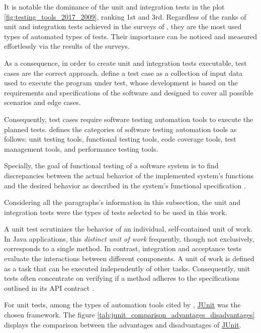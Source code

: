 It is notable the dominance of the unit and integration tests in the plot \ref{fig:testing_tools_2017_2009}, ranking 1st and 3rd. Regardless of the ranks of unit and integration tests achieved in the surveys of \cite{hynninen2023development, kasurinen2010software, lee2012survey, sanchez2020beyond}, they are the most used types of automated types of tests. Their importance can be noticed and measured effortlessly via the results of the surveys.

As a consequence, in order to create unit and integration tests executable, test cases are the correct approach. \cite{abo2023role, thant2023impact} define a test case as a collection of input data used to execute the program
under test, whose development is based on the requirements and specifications of the software and designed to cover all possible scenarios and edge cases. 

Consequently, test cases require software testing automation tools to execute the planned tests. \cite{umar2019study} defines the categories of software testing automation tools as follows: unit testing tools, functional testing tools, code coverage tools, test management tools, and performance testing tools.

Specially, the goal of functional testing of a software system is to find discrepancies between the actual behavior of the implemented system’s functions and the desired behavior as described in the system’s functional specification \cite{ostrand_balcer_1988}.

Considering all the paragraphs's information in this subsection, the unit and integration tests were the types of tests selected to be used in this work.

A unit test scrutinizes the behavior of an individual, self-contained unit of work. In Java applications, this \textit{distinct unit of work} frequently, though not exclusively, corresponds to a single method. In contrast, integration and acceptance tests evaluate the interactions between different components. A unit of work is defined as a task that can be executed independently of other tasks. Consequently, unit tests often concentrate on verifying if a method adheres to the specifications outlined in its API contract \cite{massol2004junit}.

For unit tests, among the types of automation tools cited by  \cite{umar2019study}, \hyperref[appendix:glossary]{JUnit} was the chosen framework. The figure \ref{tab:junit_comparison_advantages_disadvantages} displays the comparison between the advantages and disadvantages of \hyperref[appendix:glossary]{JUnit}.

